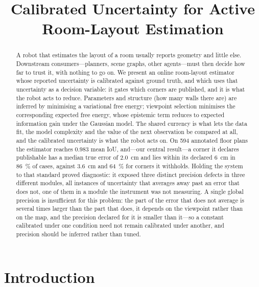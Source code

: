 \documentclass[conference,letterpaper,10pt]{IEEEtran}
\begin{document}
\title{Calibrated Uncertainty for Active Room-Layout Estimation}

\author{}

\maketitle

\begin{abstract}
A robot that estimates the layout of a room usually reports geometry and little else. Downstream
consumers---planners, scene graphs, other agents---must then decide how far to trust it, with nothing
to go on. We present an online room-layout estimator whose reported uncertainty is calibrated against
ground truth, and which uses that uncertainty as a decision variable: it gates which corners are
published, and it is what the robot acts to reduce. Parameters and structure (how many walls there
are) are inferred by minimising a variational free energy; viewpoint selection minimises the
corresponding expected free energy, whose epistemic term reduces to expected information gain under
the Gaussian model. The shared currency is what lets the data fit, the model complexity and the value
of the next observation be compared at all, and the calibrated uncertainty is what the robot acts on. On 594 annotated
floor plans the estimator reaches \num{0.983} mean IoU, and---our central result---a corner it
declares publishable has a median true error of \SI{2.0}{\centi\meter} and lies within its declared
\SI{6}{\centi\meter} in \SI{86}{\percent} of cases, against \SI{3.6}{\centi\meter} and
\SI{64}{\percent} for corners it withholds. Holding the system to that standard proved diagnostic:
it exposed three distinct precision defects in three different modules, all instances of uncertainty
that averages away past an error that does not, one of them in a module the instrument was not
measuring. A single global precision is insufficient for this problem: the part of the error that does not
average is several times larger than the part that does, it depends on the viewpoint rather than on
the map, and the precision declared for it is smaller than it---so a constant calibrated under one
condition need not remain calibrated under another, and precision should be inferred rather than
tuned.
\end{abstract}

\section{Introduction}
\end{document}
